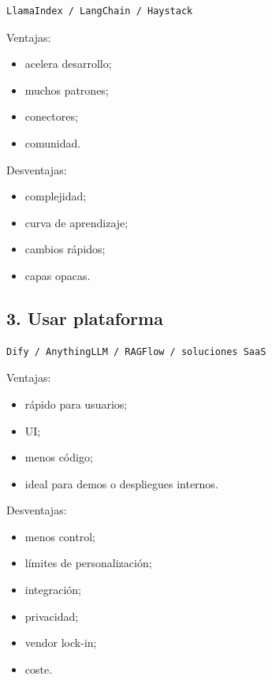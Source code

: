 \begin{lstlisting}
LlamaIndex / LangChain / Haystack
\end{lstlisting}

Ventajas:

\begin{itemize}
\tightlist
\item
  acelera desarrollo;
\item
  muchos patrones;
\item
  conectores;
\item
  comunidad.
\end{itemize}

Desventajas:

\begin{itemize}
\tightlist
\item
  complejidad;
\item
  curva de aprendizaje;
\item
  cambios rápidos;
\item
  capas opacas.
\end{itemize}

\subsection{3. Usar plataforma}\label{usar-plataforma}

\begin{lstlisting}
Dify / AnythingLLM / RAGFlow / soluciones SaaS
\end{lstlisting}

Ventajas:

\begin{itemize}
\tightlist
\item
  rápido para usuarios;
\item
  UI;
\item
  menos código;
\item
  ideal para demos o despliegues internos.
\end{itemize}

Desventajas:

\begin{itemize}
\tightlist
\item
  menos control;
\item
  límites de personalización;
\item
  integración;
\item
  privacidad;
\item
  vendor lock-in;
\item
  coste.
\end{itemize}

